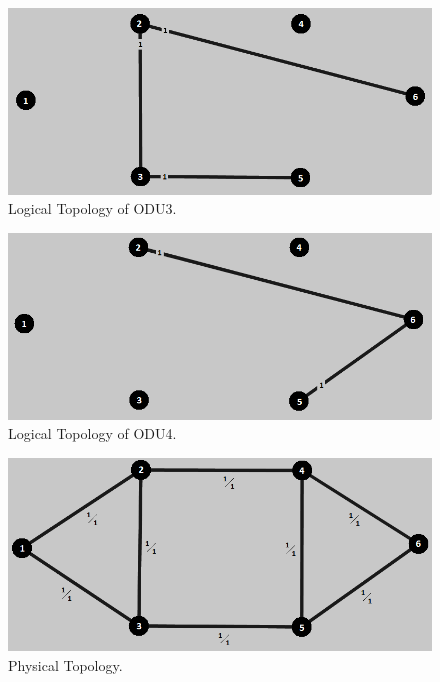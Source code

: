 \begin{figure}[H]
\centering
\includegraphics[width=13cm]{sdf/heuristic/figures/topologies/opaque_surv/low/logical_topology_odu3_low}
\caption{Logical Topology of ODU3.}
\label{logical_ODU3_surv_ref_low_heuristic}
\end{figure}

\begin{figure}[H]
\centering
\includegraphics[width=13cm]{sdf/heuristic/figures/topologies/opaque_surv/low/logical_topology_odu4_low}
\caption{Logical Topology of ODU4.}
\label{logical_ODU4_surv_ref_low_heuristic}
\end{figure}

\begin{figure}[H]
\centering
\includegraphics[width=13cm]{sdf/heuristic/figures/topologies/opaque_surv/low/physical_topology_low}
\caption{Physical Topology.}
\label{physical_topology_surv_ref_low_heuristic}
\end{figure}

